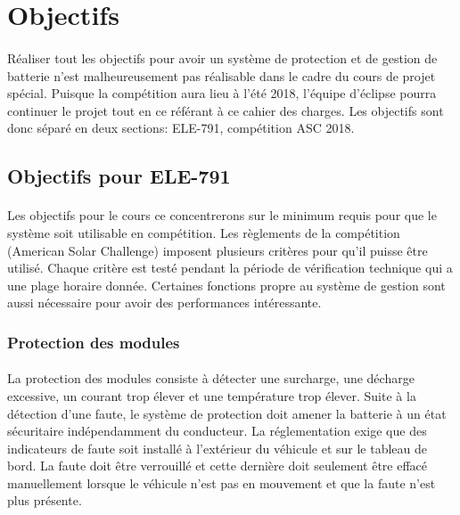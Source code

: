
\section{Objectifs}
\paragraph{}
Réaliser tout les objectifs pour avoir un système de protection et de gestion de batterie  n'est malheureusement pas réalisable dans le cadre du cours de projet spécial. Puisque la compétition aura lieu à l'été 2018, l'équipe d'éclipse pourra continuer le projet tout en ce référant à ce cahier des charges. Les objectifs sont donc séparé en deux sections: ELE-791, compétition ASC 2018.  

	\subsection{Objectifs pour ELE-791}
	\paragraph{}	
	Les objectifs pour le cours ce concentrerons sur le minimum requis pour que le système soit utilisable en compétition. Les règlements de la compétition (American Solar Challenge) imposent plusieurs critères pour qu'il puisse être utilisé. Chaque critère est testé pendant la période de vérification technique qui a une plage horaire donnée. Certaines fonctions propre au système de gestion sont aussi nécessaire pour avoir des performances intéressante.
		
		\subsubsection{Protection des modules} \label{protection_module}
		\paragraph{}
		La protection des modules consiste à détecter une surcharge, une décharge excessive, un courant trop élever et une température trop élever. Suite à la détection d'une faute, le système de protection doit amener la batterie à un état sécuritaire indépendamment du conducteur. La réglementation exige que des indicateurs de faute soit installé à l'extérieur du véhicule et sur le tableau de bord. La faute doit être verrouillé et cette dernière doit seulement être effacé manuellement lorsque le véhicule n'est pas en mouvement et que la faute n'est plus présente.
	
